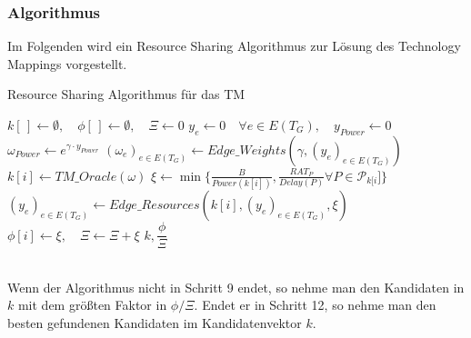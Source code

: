 \documentclass[11pt, a4paper, german]{article}
\begin{document}
\subsubsection{Algorithmus}
Im Folgenden wird ein Resource Sharing Algorithmus zur Lösung des Technology Mappings vorgestellt. \\

\LinesNumbered
\begin{algorithm}[H]
\DontPrintSemicolon
\caption{Resource Sharing Algorithmus für das TM}

   $k[\,] \gets \emptyset, \quad \phi[\,] \gets \emptyset, \quad \Xi \gets 0 $\;
  $y_e \gets 0 \quad \forall e \in E(T_G), \quad y_{Power} \gets 0$\;
     {
        $\omega_{Power} \gets e^{\gamma \cdot y_{Power}}$\;
        $(\omega_e)_{e \in E(T_G)} \gets Edge\_Weights(\gamma, (y_e)_{e \in E(T_G)})$\;
        $k[i] \gets TM\_Oracle(\omega)$\;
        $\xi \gets \min \{ \frac{B}{Power(k[i])}, \frac{RAT_P}{Delay(P)} \forall P \in \mathcal{P}_{k[i}] \}$\;
        $(y_e)_{e \in E(T_G)} \gets Edge\_Resources(k[i], (y_e)_{e \in E(T_G)}, \xi)$\;
        $\phi[i] \gets \xi, \quad \Xi \gets \Xi + \xi$
     }
     \Return $k,\dfrac{\phi}{\Xi}$
\end{algorithm}\ \\

Wenn der Algorithmus nicht in Schritt 9 endet, so nehme man den Kandidaten in $k$ mit dem größten Faktor in ${\phi}/{\Xi}$.  Endet er in Schritt 12, so nehme man den besten gefundenen Kandidaten im Kandidatenvektor $k$.
\end{document}
